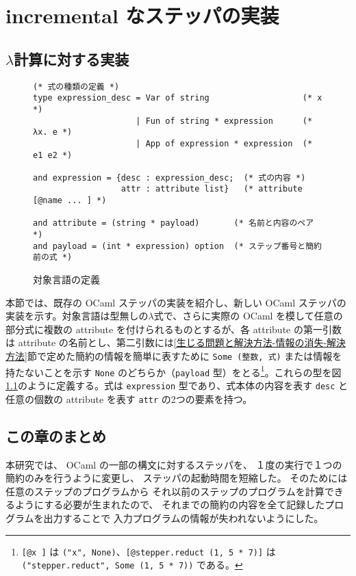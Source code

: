 \chapter{incremental なステッパの実装}
\label{chapter:incremental}







\section{$\lambda$計算に対する実装}

\begin{figure}
\begin{verbatim}
(* 式の種類の定義 *)
type expression_desc = Var of string                   (* x *)
                     | Fun of string * expression      (* λx. e *)
                     | App of expression * expression  (* e1 e2 *)
                              
and expression = {desc : expression_desc;  (* 式の内容 *)
                  attr : attribute list}   (* attribute [@name ... ] *)

and attribute = (string * payload)       (* 名前と内容のペア *)
and payload = (int * expression) option  (* ステップ番号と簡約前の式 *)
\end{verbatim}
\caption{対象言語の定義}
\label{figure:lambda}
\end{figure}

本節では、既存の OCaml ステッパ\cite{FSA18}の実装を紹介し、新しい OCaml ステッパの実装を示す。対象言語は型無しの$\lambda$式で、さらに実際の OCaml を模して任意の部分式に複数の attribute を付けられるものとするが、各 attribute の第一引数は attribute の名前とし、第二引数には\ref{生じる問題と解決方法-情報の消失-解決方法}節で定めた簡約の情報を簡単に表すために \texttt{Some (整数, 式)} または情報を持たないことを示す \texttt{None} のどちらか（\texttt{payload} 型）をとる\footnote{\texttt{[@x ]} は \texttt{("x", None)}、\texttt{[@stepper.reduct (1, 5 * 7)]} は \texttt{("stepper.reduct", Some (1, 5 * 7))} である。}。これらの型を図\ref{figure:lambda}のように定義する。式は \texttt{expression} 型であり、式本体の内容を表す \texttt{desc} と任意の個数の attribute を表す \texttt{attr} の2つの要素を持つ。











\section{この章のまとめ}

本研究では、
OCaml の一部の構文に対するステッパを、
１度の実行で１つの簡約のみを行うように変更し、
ステッパの起動時間を短縮した。
そのためには任意のステップのプログラムから
それ以前のステップのプログラムを計算できるようにする必要が生まれたので、
それまでの簡約の内容を全て記録したプログラムを出力することで
入力プログラムの情報が失われないようにした。
